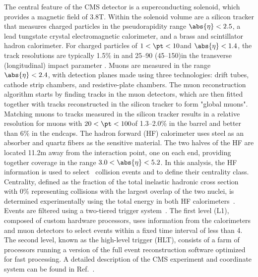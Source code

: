 The central feature of the CMS detector is a superconducting solenoid, which provides a magnetic field of 3.8\unit{T}. Within the solenoid volume are a silicon tracker that measures charged particles in the pseudorapidity range $\abs{\eta} < 2.5$, a lead tungstate crystal electromagnetic calorimeter, and a brass and scintillator hadron calorimeter. For charged particles of $1 < \pt < 10$\GeVc and $\abs{\eta} < 1.4$, the track resolutions are typically 1.5\% in \pt and 25--90 (45--150)\mum in the transverse (longitudinal) impact parameter \cite{TRK-11-001}. Muons are measured in the range $\abs{\eta} < 2.4$, with detection planes made using three technologies: drift tubes, cathode strip chambers, and resistive-plate chambers. The muon reconstruction algorithm starts by finding tracks in the muon detectors, which are then fitted together with tracks reconstructed in the silicon tracker to form "global muons". Matching muons to tracks measured in the silicon tracker results in a relative \pt resolution for muons with $20 < \pt < 100$\GeVc of 1.3--2.0\% in the barrel and better than 6\% in the endcaps.
The hadron forward (HF) calorimeter uses steel as an absorber and quartz fibers as the sensitive material. The two halves of the HF are located 11.2\unit{m} away from the interaction point, one on each end, providing together coverage in the range $3.0 < \abs{\eta} < 5.2$. In this analysis, the HF information is used to select \PbPb\ collision events and to define their centrality class. Centrality, defined as the fraction of the total inelastic hadronic cross section with 0\% representing collisions with the largest overlap of the two nuclei, is determined experimentally using the total energy in both HF calorimeters~\cite{centralityref}. 
%
Events are filtered using a two-tiered trigger system~\cite{Khachatryan:2016bia}. 
The first level (L1), composed of custom hardware processors, uses information from the calorimeters and muon detectors to select events within a fixed time interval of less than 4\mus. The second level, known as the high-level trigger (HLT), consists of a farm of processors running a version of the full event reconstruction software optimized for fast processing.
%
A detailed description of the CMS experiment and coordinate system can be found in Ref.~\cite{bib_CMS}.

